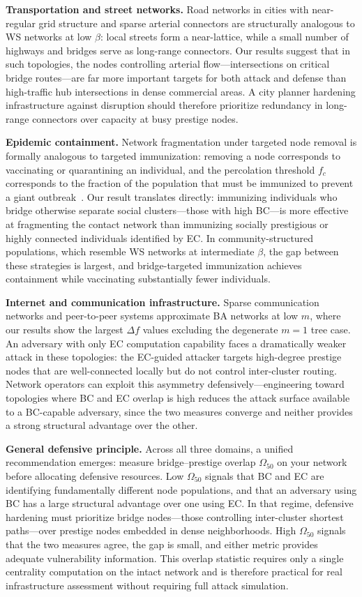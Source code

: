 \documentclass[journal]{IEEEtran}
\begin{document}
\textbf{Transportation and street networks.}
Road networks in cities with near-regular grid structure and sparse arterial
connectors are structurally analogous to WS networks at low $\beta$: local
streets form a near-lattice, while a small number of highways and bridges
serve as long-range connectors.
Our results suggest that in such topologies, the nodes controlling arterial
flow---intersections on critical bridge routes---are far more important
targets for both attack and defense than high-traffic hub intersections in
dense commercial areas.
A city planner hardening infrastructure against disruption should therefore
prioritize redundancy in long-range connectors over capacity at busy
prestige nodes.

\textbf{Epidemic containment.}
Network fragmentation under targeted node removal is formally analogous
to targeted immunization: removing a node corresponds to vaccinating or
quarantining an individual, and the percolation threshold $f_c$ corresponds
to the fraction of the population that must be immunized to prevent a
giant outbreak~\cite{pastorsatorras2002}.
Our result translates directly: immunizing individuals who bridge otherwise
separate social clusters---those with high BC---is more effective at
fragmenting the contact network than immunizing socially prestigious or
highly connected individuals identified by EC.
In community-structured populations, which resemble WS networks at
intermediate $\beta$, the gap between these strategies is largest, and
bridge-targeted immunization achieves containment while vaccinating
substantially fewer individuals.

\textbf{Internet and communication infrastructure.}
Sparse communication networks and peer-to-peer systems approximate BA
networks at low $m$, where our results show the largest $\Delta f$ values
excluding the degenerate $m=1$ tree case.
An adversary with only EC computation capability faces a dramatically
weaker attack in these topologies: the EC-guided attacker targets
high-degree prestige nodes that are well-connected locally but do not
control inter-cluster routing.
Network operators can exploit this asymmetry defensively---engineering
toward topologies where BC and EC overlap is high reduces the attack
surface available to a BC-capable adversary, since the two measures
converge and neither provides a strong structural advantage over the other.

\textbf{General defensive principle.}
Across all three domains, a unified recommendation emerges: measure
bridge--prestige overlap $\Omega_{50}$ on your network before allocating
defensive resources.
Low $\Omega_{50}$ signals that BC and EC are identifying fundamentally
different node populations, and that an adversary using BC has a large
structural advantage over one using EC.
In that regime, defensive hardening must prioritize bridge nodes---those
controlling inter-cluster shortest paths---over prestige nodes embedded
in dense neighborhoods.
High $\Omega_{50}$ signals that the two measures agree, the gap is small,
and either metric provides adequate vulnerability information.
This overlap statistic requires only a single centrality computation on
the intact network and is therefore practical for real infrastructure
assessment without requiring full attack simulation.
\end{document}

